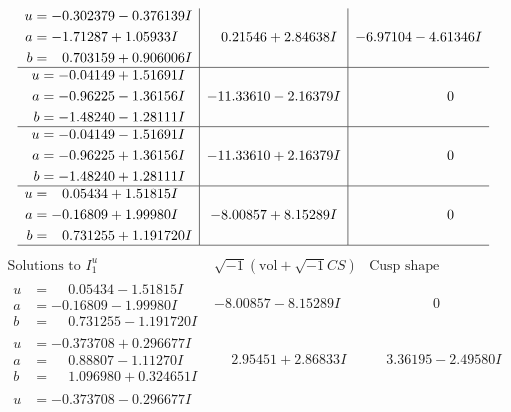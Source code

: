 \documentclass[1p]{elsarticle_modified}
\theoremstyle{definition}
\newcommand{\I}{\sqrt{-1}}
\begin{document}
$$\begin{array}{c|c|c}
\begin{aligned}
u &= -0.302379 - 0.376139 I \\
a &= -1.71287 + 1.05933 I \\
b &= \phantom{-}0.703159 + 0.906006 I\end{aligned}
 & \phantom{-}0.21546 + 2.84638 I & -6.97104 - 4.61346 I \\ \hline\begin{aligned}
u &= -0.04149 + 1.51691 I \\
a &= -0.96225 - 1.36156 I \\
b &= -1.48240 - 1.28111 I\end{aligned}
 & -11.33610 - 2.16379 I & \phantom{-0.000000 } 0 \\ \hline\begin{aligned}
u &= -0.04149 - 1.51691 I \\
a &= -0.96225 + 1.36156 I \\
b &= -1.48240 + 1.28111 I\end{aligned}
 & -11.33610 + 2.16379 I & \phantom{-0.000000 } 0 \\ \hline\begin{aligned}
u &= \phantom{-}0.05434 + 1.51815 I \\
a &= -0.16809 + 1.99980 I \\
b &= \phantom{-}0.731255 + 1.191720 I\end{aligned}
 & -8.00857 + 8.15289 I & \phantom{-0.000000 } 0\\
 \hline 
 \end{array}$$\newpage$$\begin{array}{c|c|c}  
\text{Solutions to }I^u_{1}& \I (\text{vol} + \sqrt{-1}CS) & \text{Cusp shape}\\
 \hline 
\begin{aligned}
u &= \phantom{-}0.05434 - 1.51815 I \\
a &= -0.16809 - 1.99980 I \\
b &= \phantom{-}0.731255 - 1.191720 I\end{aligned}
 & -8.00857 - 8.15289 I & \phantom{-0.000000 } 0 \\ \hline\begin{aligned}
u &= -0.373708 + 0.296677 I \\
a &= \phantom{-}0.88807 - 1.11270 I \\
b &= \phantom{-}1.096980 + 0.324651 I\end{aligned}
 & \phantom{-}2.95451 + 2.86833 I & \phantom{-}3.36195 - 2.49580 I \\ \hline\begin{aligned}
u &= -0.373708 - 0.296677 I \\

\end{aligned}
\end{array}$$
\end{document}
